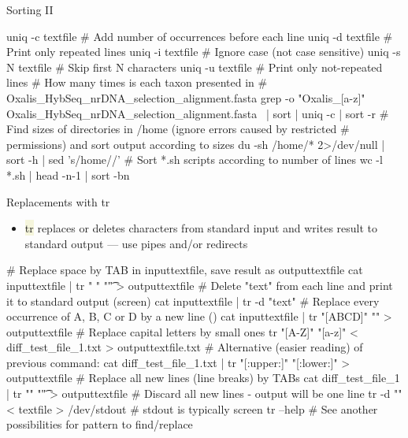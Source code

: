 \documentclass[compress, ucs, xelatex, 11pt, xcolor=svgnames, aspectratio=169,
	hyperref={
		bookmarks=true,
		unicode=true,
		colorlinks=true,
		pdftitle={Linux, command line and MetaCentrum},
		plainpages=false,
		pdfauthor={Vojtech Zeisek},
		pdfsubject={Course about use of Linux command line, writing shell scripts and using MetaCentrum of CESNET},
		pdfcreator={XeLaTeX},
		pdfkeywords={Linux, GNU, BASH, shell, command line, MetaCentrum},
		linkcolor=DarkRed, %
		anchorcolor=DarkBlue, %
		citecolor=Indigo, %
		filecolor=NavyBlue, %
		menucolor=DarkMagenta, %
		urlcolor=DarkBlue, %
		pdftex},
	url={hyphens, lowtilde} %
	]{beamer}
\renewcommand{\texttt}[1]{\colorbox{Beige}{{\ttfamily #1}}}
\begin{document}
\begin{frame}[fragile]{Sorting II}
	\begin{bashcode}
    uniq -c textfile # Add number of occurrences before each line
    uniq -d textfile # Print only repeated lines
    uniq -i textfile # Ignore case (not case sensitive)
    uniq -s N textfile # Skip first N characters
    uniq -u textfile # Print only not-repeated lines
    # How many times is each taxon presented in
    #  Oxalis_HybSeq_nrDNA_selection_alignment.fasta
    grep -o "Oxalis_[a-z]\+" Oxalis_HybSeq_nrDNA_selection_alignment.fasta \
      | sort | uniq -c | sort -r
    # Find sizes of directories in /home (ignore errors caused by restricted
    # permissions) and sort output according to sizes
    du -sh /home/* 2>/dev/null | sort -h | sed 's/\/home\///'
    # Sort *.sh scripts according to number of lines
    wc -l *.sh | head -n-1 | sort -bn
	\end{bashcode}
\end{frame}

\begin{frame}[fragile]{Replacements with tr}
	\begin{itemize}
		\item \texttt{tr} replaces or deletes characters from standard input and writes result to standard output --- use pipes and/or redirects
	\end{itemize}
	\vfill
	\begin{bashcode}
    # Replace space by TAB in inputtextfile, save result as outputtextfile
    cat inputtextfile | tr " " "\t" > outputtextfile
    # Delete "text" from each line and print it to standard output (screen)
    cat inputtextfile | tr -d "text"
    # Replace every occurrence of A, B, C or D by a new line (\n)
    cat inputtextfile | tr "[ABCD]" "\n" > outputtextfile
    # Replace capital letters by small ones
    tr "[A-Z]" "[a-z]" < diff_test_file_1.txt > outputtextfile.txt
    # Alternative (easier reading) of previous command:
    cat diff_test_file_1.txt | tr "[:upper:]" "[:lower:]" > outputtextfile
    # Replace all new lines (line breaks) by TABs
    cat diff_test_file_1 | tr "\n" "\t"  > outputtextfile
    # Discard all new lines - output will be one line
    tr -d "\n" < textfile > /dev/stdout # stdout is typically screen
    tr --help # See another possibilities for pattern to find/replace
	\end{bashcode}
\end{frame}
\end{document}
